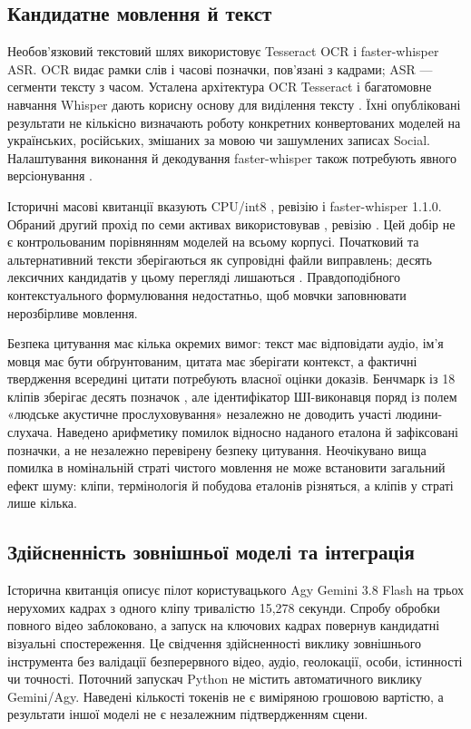 \subsection{Кандидатне мовлення й текст}
Необов'язковий текстовий шлях використовує Tesseract OCR і faster-whisper ASR. OCR видає рамки слів і часові позначки, пов'язані з кадрами; ASR --- сегменти тексту з часом. Усталена архітектура OCR Tesseract і багатомовне навчання Whisper дають корисну основу для виділення тексту \citep{smith2007tesseract,radford2023whisper}. Їхні опубліковані результати не кількісно визначають роботу конкретних конвертованих моделей на українських, російських, змішаних за мовою чи зашумлених записах Social. Налаштування виконання й декодування faster-whisper також потребують явного версіонування \citep{systran2026faster}.

Історичні масові квитанції вказують CPU/int8 , ревізію  і faster-whisper 1.1.0. Обраний другий прохід по семи активах використовував , ревізію . Цей добір не є контрольованим порівнянням моделей на всьому корпусі. Початковий та альтернативний тексти зберігаються як супровідні файли виправлень; десять лексичних кандидатів у цьому перегляді лишаються . Правдоподібного контекстуального формулювання недостатньо, щоб мовчки заповнювати нерозбірливе мовлення.

Безпека цитування має кілька окремих вимог: текст має відповідати аудіо, ім'я мовця має бути обґрунтованим, цитата має зберігати контекст, а фактичні твердження всередині цитати потребують власної оцінки доказів. Бенчмарк із 18 кліпів зберігає десять позначок , але ідентифікатор ШІ-виконавця поряд із полем «людське акустичне прослуховування» незалежно не доводить участі людини-слухача. Наведено арифметику помилок відносно наданого еталона й зафіксовані позначки, а не незалежно перевірену безпеку цитування. Неочікувано вища помилка в номінальній страті чистого мовлення не може встановити загальний ефект шуму: кліпи, термінологія й побудова еталонів різняться, а кліпів у страті лише кілька.

\subsection{Здійсненність зовнішньої моделі та інтеграція}
Історична квитанція описує пілот користувацького Agy Gemini 3.8 Flash на трьох нерухомих кадрах з одного кліпу тривалістю 15,278 секунди. Спробу обробки повного відео заблоковано, а запуск на ключових кадрах повернув кандидатні візуальні спостереження. Це свідчення здійсненності виклику зовнішнього інструмента без валідації безперервного відео, аудіо, геолокації, особи, істинності чи точності. Поточний запускач Python не містить автоматичного виклику Gemini/Agy. Наведені кількості токенів не є виміряною грошовою вартістю, а результати іншої моделі не є незалежним підтвердженням сцени.
